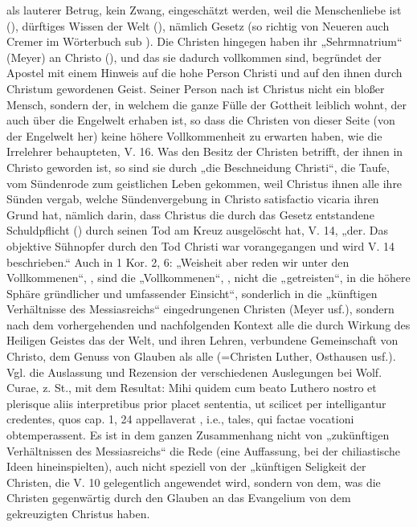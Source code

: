 als lauterer Betrug, kein Zwang, eingeschätzt werden, weil die Menschenliebe ist (\textit{\textchi\alpha\rho\alpha \tau\eta\nu \pi\alpha\rho\alpha\delta\omicron\upsilon\sigma\alpha\nu \tau\omicron\nu \alpha\nu\theta\rho\omega\pi\omicron\nu}), dürftiges Wissen der Welt (\textit{\textchi\alpha\rho\alpha \tau\alpha \sigma\tau\omicron\iota\chi\epsilon\iota\alpha \tau\omicron\upsilon \kappa\omicron\sigma\mu\omicron\upsilon}), nämlich Gesetz (so richtig von Neueren auch Cremer im Wörterbuch sub \textit{\sigma\tau\omicron\iota\chi\epsilon\iota\omicron}). Die Christen hingegen haben ihr „Sehrmnatrium“ (Meyer) an Christo (\textit{\textchi\alpha\rho\alpha \Chi\rho\iota\sigma\tau\omicron\nu}), und das sie dadurch vollkommen sind, begründet der Apostel mit einem Hinweis auf die hohe Person Christi und auf den ihnen durch Christum gewordenen Geist. Seiner Person nach ist Christus nicht ein bloßer Mensch, sondern der, in welchem die ganze Fülle der Gottheit leiblich wohnt, der auch über die Engelwelt erhaben ist, so dass die Christen von dieser Seite (von der Engelwelt her) keine höhere Vollkommenheit zu erwarten haben, wie die Irrelehrer behaupteten, V. 16. Was den Besitz der Christen betrifft, der ihnen in Christo geworden ist, so sind sie durch „die Beschneidung Christi“, die Taufe, vom Sündenrode zum geistlichen Leben gekommen, weil Christus ihnen alle ihre Sünden vergab, welche Sündenvergebung in Christo satisfactio vicaria ihren Grund hat, nämlich darin, dass Christus die durch das Gesetz entstandene Schuldpflicht (\textit{\chi\epsilon\iota\rho\omicron\gamma\rho\alpha\phi\omicron\nu}) durch seinen Tod am Kreuz ausgelöscht hat, V. 14, „der. Das objektive Sühnopfer durch den Tod Christi war vorangegangen und wird V. 14 beschrieben.“ Auch in 1 Kor. 2, 6: „Weisheit aber reden wir unter den Vollkommenen“, \textit{\sigma\omicron\phi\iota\alpha\nu \delta\epsilon \lambda\alpha\lambda\omicron\upsilon\mu\epsilon\nu \epsilon\nu \tau\omicron\iota\varsigma \tau\epsilon\lambda\epsilon\iota\omicron\iota\varsigma}, sind die „Vollkommenen“, \textit{\tau\epsilon\lambda\epsilon\iota\omicron\iota}, nicht die „getreisten“, in die höhere Sphäre gründlicher und umfassender Einsicht“, sonderlich in die „künftigen Verhältnisse des Messiasreichs“ eingedrungenen Christen (Meyer usf.), sondern nach dem vorhergehenden und nachfolgenden Kontext alle die durch Wirkung des Heiligen Geistes das der Welt, und ihren Lehren, verbundene Gemeinschaft von Christo, dem Genuss von Glauben als alle (=Christen Luther, Osthausen usf.). Vgl. die Auslassung und Rezension der verschiedenen Auslegungen bei Wolf. Curae, z. St., mit dem Resultat: Mihi quidem cum beato Luthero nostro et plerisque aliis interpretibus prior placet sententia, ut scilicet per \textit{\tau\epsilon\lambda\epsilon\iota\omicron\upsilon\varsigma} intelligantur credentes, quos cap. 1, 24 appellaverat \textit{\pi\iota\sigma\tau\omicron\upsilon\varsigma}, i.e., tales, qui factae vocationi obtemperassent. Es ist in dem ganzen Zusammenhang nicht von „zukünftigen Verhältnissen des Messiasreichs“ die Rede (eine Auffassung, bei der chiliastische Ideen hineinspielten), auch nicht speziell von der „künftigen Seligkeit der Christen, die V. 10 gelegentlich angewendet wird, sondern von dem, was die Christen gegenwärtig durch den Glauben an das Evangelium von dem gekreuzigten Christus haben.